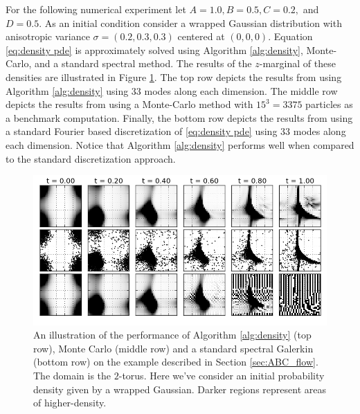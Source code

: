 \documentclass[final,leqno]{siamart}
\begin{document}
%
For the following numerical experiment let $A=1.0,B=0.5,C=0.2,$ and $D=0.5$.
As an initial condition consider a wrapped Gaussian distribution with anisotropic variance $\sigma= (0.2, 0.3, 0.3)$ centered at $(0,0,0)$.
Equation \eqref{eq:density pde} is approximately solved using Algorithm \ref{alg:density}, Monte-Carlo, and a standard spectral method.
The results of the $z$-marginal of these densities are illustrated in Figure \ref{fig:ABCD}.
The top row depicts the results from using Algorithm \ref{alg:density} using $33$ modes along each dimension.
The middle row depicts the results from using a Monte-Carlo method with $15^{3} = 3375$ particles as a benchmark computation.
Finally, the bottom row depicts the results from using a standard Fourier based discretization of \eqref{eq:density pde} using 33 modes along each dimension.
Notice that Algorithm \ref{alg:density} performs well when compared to the standard discretization approach.

\begin{figure}[h!]
	\centering
	\includegraphics[width=1\textwidth]{./images/ABCD_flow.png}
	\caption{An illustration of the performance of Algorithm \ref{alg:density} (top row), Monte Carlo (middle row) and a standard spectral Galerkin (bottom row) on the example described in Section \ref{sec:ABC_flow}.
	The domain is the $2$-torus.  Here we've consider an initial probability density given by a wrapped Gaussian. Darker regions represent areas of higher-density.}
	\label{fig:ABCD}
\end{figure}
\end{document}
